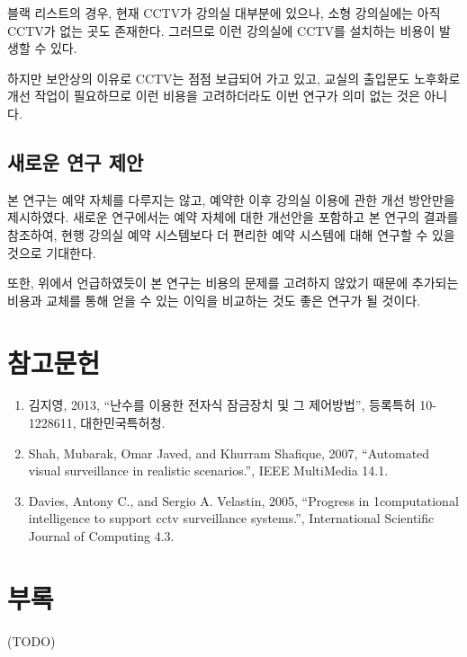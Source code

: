 \documentclass[11pt,a4paper]{article}
\begin{document}
블랙 리스트의 경우, 현재 CCTV가 강의실 대부분에 있으나, 소형 강의실에는 아직
CCTV가 없는 곳도 존재한다. 그러므로 이런 강의실에 CCTV를 설치하는 비용이 발생할
수 있다.

하지만 보안상의 이유로 CCTV는 점점 보급되어 가고 있고, 교실의 출입문도 노후화로
개선 작업이 필요하므로 이런 비용을 고려하더라도 이번 연구가 의미 없는 것은
아니다.

\subsection{새로운 연구 제안}
본 연구는 예약 자체를 다루지는 않고, 예약한 이후 강의실 이용에 관한 개선
방안만을 제시하였다. 새로운 연구에서는 예약 자체에 대한 개선안을 포함하고 본
연구의 결과를 참조하여, 현행 강의실 예약 시스템보다 더 편리한 예약 시스템에
대해 연구할 수 있을 것으로 기대한다.

또한, 위에서 언급하였듯이 본 연구는 비용의 문제를 고려하지 않았기 때문에
추가되는 비용과 교체를 통해 얻을 수 있는 이익을 비교하는 것도 좋은 연구가 될
것이다.

\section{참고문헌}
\begin{enumerate}
\item 김지영, 2013, “난수를 이용한 전자식 잠금장치 및 그 제어방법”, 등록특허 10-1228611, 대한민국특허청.
\item Shah, Mubarak, Omar Javed, and Khurram Shafique, 2007, “Automated visual surveillance in realistic scenarios.”, IEEE MultiMedia 14.1.
\item Davies, Antony C., and Sergio A. Velastin, 2005, “Progress in 1computational intelligence to support cctv surveillance systems.”, International Scientific Journal of Computing 4.3.
\end{enumerate}

\section{부록}
(TODO)
\end{document}
